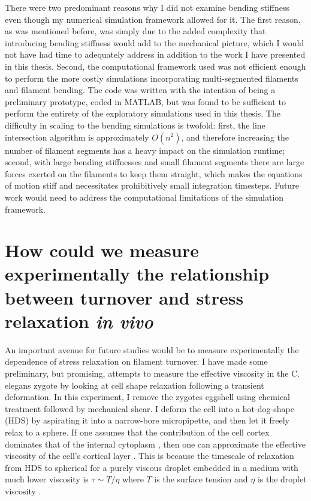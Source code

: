 There were two predominant reasons why I did not examine bending stiffness even though my numerical simulation framework allowed for it.  The first reason, as was mentioned before, was simply due to the added complexity that introducing bending stiffness would add to the mechanical picture, which I would not have had time to adequately address in addition to the work I have presented in this thesis.  Second, the computational framework used was not efficient enough to perform the more costly simulations incorporating multi-segmented filaments and filament bending.  The code was written with the intention of being a preliminary prototype, coded in MATLAB, but was found to be sufficient to perform the entirety of the exploratory simulations used in this thesis.  The difficulty in scaling to the bending simulations is twofold: first, the line intersection algorithm is approximately $O(n^2)$, and therefore increasing the number of filament segments has a heavy impact on the simulation runtime; second, with large bending stiffnesses and small filament segments there are large forces exerted on the filaments to keep them straight, which makes the equations of motion stiff and necessitates prohibitively small integration timesteps.  Future work would need to address the computational limitations of the simulation framework.





\section{How could we measure experimentally the relationship between turnover and stress relaxation \textit{in vivo}}
An important avenue for future studies would be to measure experimentally the dependence of stress relaxation on filament turnover.  I have made some preliminary, but promising, attempts  to measure the effective viscosity in the C. elegans zygote  by looking at cell shape relaxation following a transient deformation. In this experiment, I remove the zygotes eggshell using chemical treatment followed by mechanical shear. I deform the cell into a hot-dog-shape (HDS) by aspirating it into a narrow-bore micropipette, and then let it freely relax to a sphere.  If one assumes that the contribution of the cell cortex dominates that of the internal cytoplasm , then one can approximate the effective viscosity of the cell's cortical layer \cite{paluchheis,Stewart2012}.  This is because the timescale of relaxation from HDS to spherical for a purely viscous droplet embedded in a medium with much lower viscosity is $\tau \sim T/\eta$ where $T$ is the surface tension and $\eta$ is the droplet viscosity \cite{PhysRevE.63.061508,Chandrasekhar1961}.  

